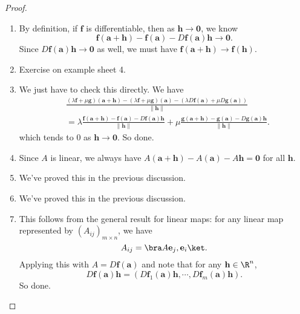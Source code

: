 \documentclass[a4paper]{article}
\begin{document}
\begin{proof}\leavevmode
  \begin{enumerate}
    \item By definition, if $\mathbf{f}$ is differentiable, then as $\mathbf{h} \to \mathbf{0}$, we know
      \[
        \mathbf{f}(\mathbf{a} + \mathbf{h}) - \mathbf{f}(\mathbf{a}) - D \mathbf{f}(\mathbf{a}) \mathbf{h} \to \mathbf{0}.
      \]
      Since $D \mathbf{f}(\mathbf{a})\mathbf{h} \to \mathbf{0}$ as well, we must have $\mathbf{f}(\mathbf{a} + \mathbf{h}) \to \mathbf{f}(\mathbf{h})$.
    \item Exercise on example sheet 4.
    \item We just have to check this directly. We have
      \begin{align*}
        &\frac{(\lambda \mathbf{f} + \mu \mathbf{g})(\mathbf{a} + \mathbf{h}) - (\lambda \mathbf{f} + \mu \mathbf{g})(\mathbf{a}) - (\lambda D \mathbf{f}(\mathbf{a}) + \mu D \mathbf{g}(\mathbf{a}))}{\|\mathbf{h}\|}\\
        &= \lambda \frac{\mathbf{f}(\mathbf{a} + \mathbf{h}) - \mathbf{f}(\mathbf{a}) - D \mathbf{f}(\mathbf{a})\mathbf{h}}{\|\mathbf{h}\|} + \mu\frac{\mathbf{g}(\mathbf{a} + \mathbf{h}) - \mathbf{g}(\mathbf{a}) - D \mathbf{g}(\mathbf{a}) \mathbf{h}}{\|\mathbf{h}\|}.
      \end{align*}
      which tends to $0$ as $\mathbf{h} \to \mathbf{0}$. So done.
    \item Since $A$ is linear, we always have $A (\mathbf{a} + \mathbf{h}) - A (\mathbf{a}) - A \mathbf{h} = \mathbf{0}$ for all $\mathbf{h}$.
    \item We've proved this in the previous discussion.
    \item We've proved this in the previous discussion.
    \item This follows from the general result for linear maps: for any linear map represented by $(A_{ij})_{m \times n}$, we have
      \[
        A_{ij} = \bra A \mathbf{e}_j, \mathbf{e}_i\ket.
      \]
      Applying this with $A = D \mathbf{f}(\mathbf{a})$ and note that for any $\mathbf{h} \in \R^n$,
      \[
        D \mathbf{f}(\mathbf{a}) \mathbf{h} = (D \mathbf{f}_1 (\mathbf{a}) \mathbf{h}, \cdots, D \mathbf{f}_m (\mathbf{a}) \mathbf{h}).
      \]
      So done.
  \end{enumerate}
\end{proof}
\end{document}
